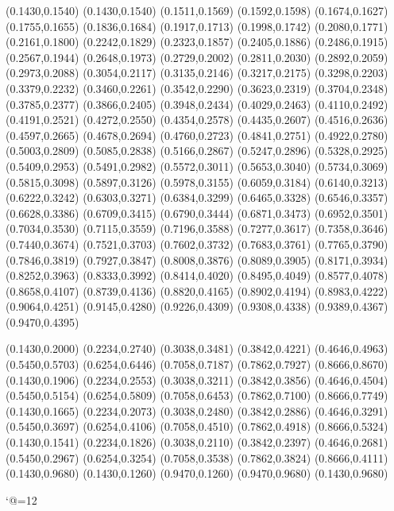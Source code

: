 \PST@LongDash(0.1430,0.1540)
(0.1430,0.1540)
(0.1511,0.1569)
(0.1592,0.1598)
(0.1674,0.1627)
(0.1755,0.1655)
(0.1836,0.1684)
(0.1917,0.1713)
(0.1998,0.1742)
(0.2080,0.1771)
(0.2161,0.1800)
(0.2242,0.1829)
(0.2323,0.1857)
(0.2405,0.1886)
(0.2486,0.1915)
(0.2567,0.1944)
(0.2648,0.1973)
(0.2729,0.2002)
(0.2811,0.2030)
(0.2892,0.2059)
(0.2973,0.2088)
(0.3054,0.2117)
(0.3135,0.2146)
(0.3217,0.2175)
(0.3298,0.2203)
(0.3379,0.2232)
(0.3460,0.2261)
(0.3542,0.2290)
(0.3623,0.2319)
(0.3704,0.2348)
(0.3785,0.2377)
(0.3866,0.2405)
(0.3948,0.2434)
(0.4029,0.2463)
(0.4110,0.2492)
(0.4191,0.2521)
(0.4272,0.2550)
(0.4354,0.2578)
(0.4435,0.2607)
(0.4516,0.2636)
(0.4597,0.2665)
(0.4678,0.2694)
(0.4760,0.2723)
(0.4841,0.2751)
(0.4922,0.2780)
(0.5003,0.2809)
(0.5085,0.2838)
(0.5166,0.2867)
(0.5247,0.2896)
(0.5328,0.2925)
(0.5409,0.2953)
(0.5491,0.2982)
(0.5572,0.3011)
(0.5653,0.3040)
(0.5734,0.3069)
(0.5815,0.3098)
(0.5897,0.3126)
(0.5978,0.3155)
(0.6059,0.3184)
(0.6140,0.3213)
(0.6222,0.3242)
(0.6303,0.3271)
(0.6384,0.3299)
(0.6465,0.3328)
(0.6546,0.3357)
(0.6628,0.3386)
(0.6709,0.3415)
(0.6790,0.3444)
(0.6871,0.3473)
(0.6952,0.3501)
(0.7034,0.3530)
(0.7115,0.3559)
(0.7196,0.3588)
(0.7277,0.3617)
(0.7358,0.3646)
(0.7440,0.3674)
(0.7521,0.3703)
(0.7602,0.3732)
(0.7683,0.3761)
(0.7765,0.3790)
(0.7846,0.3819)
(0.7927,0.3847)
(0.8008,0.3876)
(0.8089,0.3905)
(0.8171,0.3934)
(0.8252,0.3963)
(0.8333,0.3992)
(0.8414,0.4020)
(0.8495,0.4049)
(0.8577,0.4078)
(0.8658,0.4107)
(0.8739,0.4136)
(0.8820,0.4165)
(0.8902,0.4194)
(0.8983,0.4222)
(0.9064,0.4251)
(0.9145,0.4280)
(0.9226,0.4309)
(0.9308,0.4338)
(0.9389,0.4367)
(0.9470,0.4395)

\PST@Diamond(0.1430,0.2000)
\PST@Diamond(0.2234,0.2740)
\PST@Diamond(0.3038,0.3481)
\PST@Diamond(0.3842,0.4221)
\PST@Diamond(0.4646,0.4963)
\PST@Diamond(0.5450,0.5703)
\PST@Diamond(0.6254,0.6446)
\PST@Diamond(0.7058,0.7187)
\PST@Diamond(0.7862,0.7927)
\PST@Diamond(0.8666,0.8670)
\PST@Plus(0.1430,0.1906)
\PST@Plus(0.2234,0.2553)
\PST@Plus(0.3038,0.3211)
\PST@Plus(0.3842,0.3856)
\PST@Plus(0.4646,0.4504)
\PST@Plus(0.5450,0.5154)
\PST@Plus(0.6254,0.5809)
\PST@Plus(0.7058,0.6453)
\PST@Plus(0.7862,0.7100)
\PST@Plus(0.8666,0.7749)
\PST@Square(0.1430,0.1665)
\PST@Square(0.2234,0.2073)
\PST@Square(0.3038,0.2480)
\PST@Square(0.3842,0.2886)
\PST@Square(0.4646,0.3291)
\PST@Square(0.5450,0.3697)
\PST@Square(0.6254,0.4106)
\PST@Square(0.7058,0.4510)
\PST@Square(0.7862,0.4918)
\PST@Square(0.8666,0.5324)
\PST@Cross(0.1430,0.1541)
\PST@Cross(0.2234,0.1826)
\PST@Cross(0.3038,0.2110)
\PST@Cross(0.3842,0.2397)
\PST@Cross(0.4646,0.2681)
\PST@Cross(0.5450,0.2967)
\PST@Cross(0.6254,0.3254)
\PST@Cross(0.7058,0.3538)
\PST@Cross(0.7862,0.3824)
\PST@Cross(0.8666,0.4111)
\PST@Border(0.1430,0.9680)
(0.1430,0.1260)
(0.9470,0.1260)
(0.9470,0.9680)
(0.1430,0.9680)

\catcode`@=12
\fi
\endpspicture
